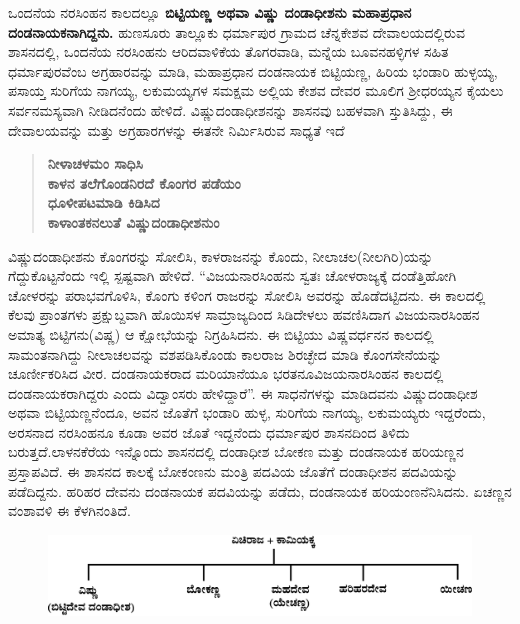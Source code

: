 ಒಂದನೆಯ ನರಸಿಂಹನ ಕಾಲದಲ್ಲೂ \textbf{ಬಿಟ್ಟಿಯಣ್ಣ ಅಥವಾ ವಿಷ್ಣು ದಂಡಾಧೀಶನು ಮಹಾಪ್ರಧಾನ ದಂಡನಾಯಕ\-ನಾಗಿದ್ದನು.} ಹುಣಸೂರು ತಾಲ್ಲೂಕು ಧರ್ಮಾಪುರ ಗ್ರಾಮದ ಚೆನ್ನಕೇಶವ ದೇವಾಲಯದಲ್ಲಿರುವ ಶಾಸನದಲ್ಲಿ, ಒಂದನೆಯ ನರಸಿಂಹನು ಆರಿದವಾಳಿಕೆಯ ತೊಗರವಾಡಿ, ಮನ್ನೆಯ ಬೂವನಹಳ್ಳಿಗಳ ಸಹಿತ ಧರ್ಮಾಪುರವೆಂಬ ಅಗ್ರಹಾರವನ್ನು ಮಾಡಿ, ಮಹಾಪ್ರಧಾನ ದಂಡನಾಯಕ ಬಿಟ್ಟಿಯಣ್ಣ, ಹಿರಿಯ ಭಂಡಾರಿ ಹುಳ್ಳಯ್ಯ, ಪಸಾಯ್ತ ಸುರಿಗೆಯ ನಾಗಯ್ಯ, ಲಕುಮಯ್ಯಗಳ ಸಮಕ್ಷಮ ಅಲ್ಲಿಯ ಕೇಶವ ದೇವರ ಮೂಲಿಗ ಶ‍್ರೀಧರಯ್ಯನ ಕೈಯಲು ಸರ್ವನಮಸ್ಯವಾಗಿ ನೀಡಿದನೆಂದು ಹೇಳಿದೆ. ವಿಷ್ಣುದಂಡಾಧೀಶ\-ನನ್ನು ಶಾಸನವು ಬಹಳವಾಗಿ ಸ್ತುತಿಸಿದ್ದು, ಈ ದೇವಾಲಯವನ್ನು ಮತ್ತು ಅಗ್ರಹಾರಗಳನ್ನು ಈತನೇ ನಿರ್ಮಿಸಿರುವ ಸಾಧ್ಯತೆ ಇದೆ

\begin{verse}
\textbf{ನೀಳಾಚಳಮಂ ಸಾಧಿಸಿ} \\\textbf{ಕಾಳನ ತಲೆಗೊಂಡನಿರದೆ ಕೊಂಗರ ಪಡೆಯಂ} \\\textbf{ಧೂಳೀಪಟಮಾಡಿ ಕಿಡಿಸಿದ} \\\textbf{ಕಾಳಾಂತಕನಲುತೆ ವಿಷ್ಣುದಂಡಾಧೀಶನುಂ}
\end{verse}

ವಿಷ್ಣುದಂಡಾಧೀಶನು ಕೊಂಗರನ್ನು ಸೋಲಿಸಿ, ಕಾಳರಾಜನನ್ನು ಕೊಂದು, ನೀಲಾಚಲ(ನೀಲಗಿರಿ)ಯನ್ನು ಗೆದ್ದು\-ಕೊಟ್ಟನೆಂದು ಇಲ್ಲಿ ಸ್ಪಷ್ಟವಾಗಿ ಹೇಳಿದೆ. “ವಿಜಯನಾರಸಿಂಹನು ಸ್ವತಃ ಚೋಳರಾಜ್ಯಕ್ಕೆ ದಂಡೆತ್ತಿಹೋಗಿ ಚೋಳರನ್ನು ಪರಾಭವಗೊಳಿಸಿ, ಕೊಂಗು ಕಳಿಂಗ ರಾಜರನ್ನು ಸೋಲಿಸಿ ಅವರನ್ನು ಹೊಡೆದಟ್ಟಿದನು. ಈ ಕಾಲದಲ್ಲಿ ಕೆಲವು ಪ್ರಾಂತಗಳು ಪ್ರಕ್ಷುಬ್ದವಾಗಿ ಹೊಯಿಸಳ ಸಾಮ್ರಾಜ್ಯದಿಂದ ಸಿಡಿದೇಳಲು ಹವಣಿಸಿದಾಗ ವಿಜಯನಾರಸಿಂಹನ ಅಮಾತ್ಯ ಬಿಟ್ಟಿಗನು(ವಿಷ್ಣ) ಆ ಕ್ಷೋಭೆಯನ್ನು ನಿಗ್ರಹಿಸಿದನು. ಈ ಬಿಟ್ಟಿಯು ವಿಷ್ಣವರ್ಧನನ ಕಾಲದಲ್ಲಿ ಸಾಮಂತನಾಗಿದ್ದು ನೀಲಾಚಲವನ್ನು ವಶಪಡಿಸಿಕೊಂಡು ಕಾಲರಾಜ ಶಿರಚ್ಛೇದ ಮಾಡಿ ಕೊಂಗಸೇನೆಯನ್ನು ಚೂರ್ಣೀಕರಿಸಿದ ವೀರ. ದಂಡನಾಯಕರಾದ ಮರಿಯಾನೆಯೂ ಭರತನೂ\break ವಿಜಯನಾರಸಿಂಹನ ಕಾಲದಲ್ಲಿ ದಂಡನಾಯಕರಾಗಿದ್ದರು ಎಂದು ವಿದ್ವಾಂಸರು ಹೇಳಿದ್ದಾರೆ”. ಈ ಸಾಧನೆಗಳನ್ನು ಮಾಡಿದವನು ವಿಷ್ಣುದಂಡಾಧೀಶ ಅಥವಾ ಬಿಟ್ಟಿಯಣ್ಣನೆಂದೂ, ಅವನ ಜೊತೆಗೆ ಭಂಡಾರಿ ಹುಳ್ಳ, ಸುರಿಗೆಯ ನಾಗಯ್ಯ, ಲಕುಮಯ್ಯರು ಇದ್ದರೆಂದು, ಅರಸನಾದ ನರಸಿಂಹನೂ ಕೂಡಾ ಅವರ ಜೊತೆ ಇದ್ದನೆಂದು ಧರ್ಮಾಪುರ ಶಾಸನದಿಂದ ತಿಳಿದು ಬರುತ್ತದೆ.ಲಾಳನಕೆರೆಯ ಇನ್ನೊಂದು ಶಾಸನದಲ್ಲಿ ದಂಡಾಧೀಶ ಬೋಕಣ ಮತ್ತು ದಂಡನಾಯಕ ಹರಿಯಣ್ಣನ ಪ್ರಸ್ತಾಪ\-ವಿದೆ. ಈ ಶಾಸನದ ಕಾಲಕ್ಕೆ ಬೋಕಂಣನು ಮಂತ್ರಿ ಪದವಿಯ ಜೊತೆಗೆ ದಂಡಾಧೀಶನ ಪದವಿಯನ್ನು ಪಡೆದಿದ್ದನು. ಹರಿಹರ ದೇವನು ದಂಡನಾಯಕ ಪದವಿಯನ್ನು ಪಡೆದು, ದಂಡನಾಯಕ ಹರಿಯಂಣನೆನಿಸಿದನು. ಏಚಣ್ಣನ ವಂಶಾವಳಿ ಈ ಕೆಳಗಿನಂತಿದೆ.

\newpage

\begin{figure}[H]
\includegraphics[scale=1.15]{images/chap3/chap3fig12.jpeg}
\end{figure}

